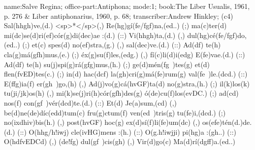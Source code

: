 name:Salve Regina;
office-part:Antiphona;
mode:1;
book:The Liber Usualis, 1961, p. 276 & Liber antiphonarius, 1960, p. 68;
transcriber:Andrew Hinkley;
(c4) Sal(hhgh)ve,(d.) <sp>*</sp>(,) Re(hg)gí(fe/fgf)na,(ed..) (;) ma(c)ter(d) mi(dc)se(d)ri(ef)cór(g)di(dec)ae :(d.) (::) Vi(hhgh)ta,(d.) (,) dul(hg)cé(fe/fgf)do,(ed..) (;) et(c) spes(d) no(ef)stra,(g.) (,) sal(dec)ve.(d.) (::) Ad(df) te(h) cla(g)má(gfh)mus,(e.) (;) éx(g)su(f)les,(edg.) (,) fí(c)li(d)i(edg) E(fe)vae.(d.) (::) Ad(df) te(h) su(j)spi(g)rá(gfg)mus,(h.) (;) ge(d)mén(fg~)tes(g) et(d) flen(fvED)tes(c.) (;) in(d) hac(dcf) la(gh)cri(g)má(fe)rum(g) val(fe~)le.(dcd.) (::) E(ffg)ia(f) er(gh~)go,(h) (,) Ad(j)vo(g)cá(hvGF)ta(d) no(g)stra,(h.) (;) il(k)los(k) tu(ji/jk)os(h) (,) mi(k)se(j)ri(h)cór(gfh)des(g) ó(de)cu(f)los(evDC.) (;) ad(cd) nos(f) con(gf~)vér(dcd)te.(d.) (::) Et(d) Je(a)sum,(cd) (,) be(d)ne(de)díc(edd)tum(c) fru(g)ctum(f) ven(ed~)tris(g) tu(fe)i,(dcd.) (;) no(ixdhiv)bis(h.) (,) post(hvGF) hoc(g) ex(d)sí(f)li(fe)um(dc) (,) os(efe)tén(d.)de.(d.) (::) O(hhg/h!iwj) cle(ivHG)mens :(h.) (::) O(g.h!iwjji) pi(hg)a :(gh..) (::) O(hdfvEDCd) (,) (de!fg) dul(gf~)cis(gh) (,) Vir(d)go(c) Ma(d)rí(dgff)a.(ed..)